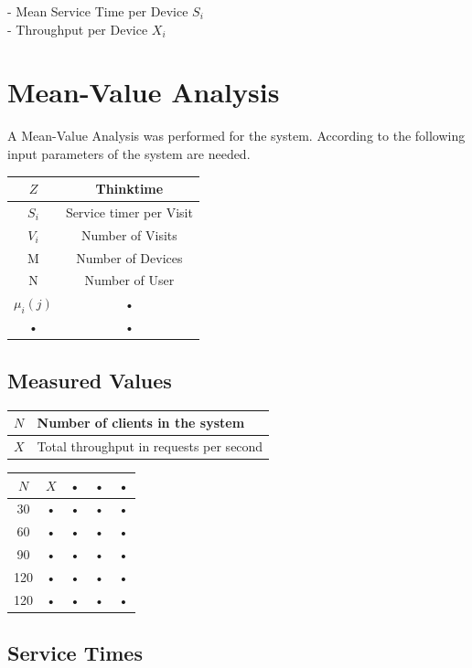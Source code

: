 \documentclass[a4paper]{article}
\begin{document}
- Mean Service Time per Device $S_i$\\
- Throughput per Device $X_i$


\section{Mean-Value Analysis}

A Mean-Value Analysis was performed for the system. According to \cite[Box 31.2]{Raj} the following input parameters of the system are needed.

\begin{tabular}{|c|c|}
\hline 
$Z$ & Thinktime \\ 
\hline 
$S_i$ & Service timer per Visit \\ 
\hline 
$V_i$ & Number of Visits \\ 
\hline 
M & Number of Devices \\ 
\hline 
N & Number of User \\ 
\hline 
$\mu_i(j)$ & • \\ 
\hline 
• & • \\ 
\hline 
\end{tabular} 



\subsection{Measured Values}

\begin{tabular}{|l|l|}
\hline 
$N$ & Number of clients in the system \\ 
\hline 
$X$ & Total throughput in requests per second \\ 
\hline 
\end{tabular} 

\begin{tabular}{|c|c|c|c|c|}
\hline 
$N$ & $X$ & • & • & • \\ 
\hline 
30 & • & • & • & • \\ 
\hline 
60 & • & • & • & • \\ 
\hline 
90 & • & • & • & • \\ 
\hline 
120 & • & • & • & • \\ 
\hline 
120 & • & • & • & • \\ 
\hline 
\end{tabular} 

\subsection{Service Times}
\end{document}
